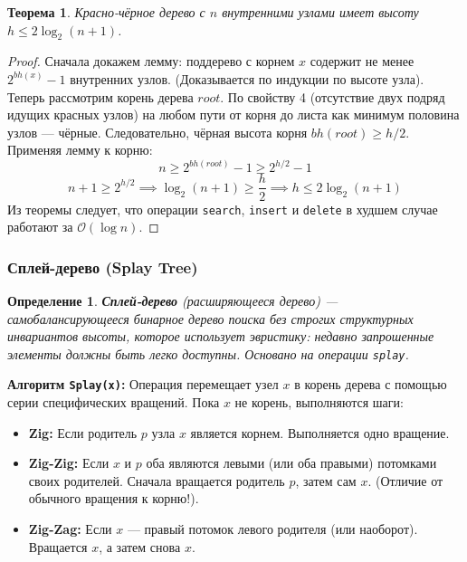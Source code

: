 \documentclass[12pt,a4paper]{article}
\newtheorem{definition}{Определение}
\newtheorem{theorem}{Теорема}
\begin{document}
\begin{theorem}
Красно-чёрное дерево с $n$ внутренними узлами имеет высоту $h \le 2 \log_2(n+1)$.
\end{theorem}
\begin{proof}
Сначала докажем лемму: поддерево с корнем $x$ содержит не менее $2^{bh(x)} - 1$ внутренних узлов. (Доказывается по индукции по высоте узла).
Теперь рассмотрим корень дерева $root$. По свойству 4 (отсутствие двух подряд идущих красных узлов) на любом пути от корня до листа как минимум половина узлов — чёрные. Следовательно, чёрная высота корня $bh(root) \ge h/2$.
Применяя лемму к корню:
$$ n \ge 2^{bh(root)} - 1 \ge 2^{h/2} - 1 $$
$$ n + 1 \ge 2^{h/2} \implies \log_2(n+1) \ge \frac{h}{2} \implies h \le 2 \log_2(n+1) $$
Из теоремы следует, что операции \texttt{search}, \texttt{insert} и \texttt{delete} в худшем случае работают за $\mathcal{O}(\log n)$.
\end{proof}

\subsubsection{Сплей-дерево (Splay Tree)}
\begin{definition}
\textbf{Сплей-дерево} (расширяющееся дерево) — самобалансирующееся бинарное дерево поиска без строгих структурных инвариантов высоты, которое использует эвристику: недавно запрошенные элементы должны быть легко доступны. Основано на операции \texttt{splay}.
\end{definition}

\textbf{Алгоритм \texttt{Splay(x)}:}
Операция перемещает узел $x$ в корень дерева с помощью серии специфических вращений. Пока $x$ не корень, выполняются шаги:
\begin{itemize}
    \item \textbf{Zig:} Если родитель $p$ узла $x$ является корнем. Выполняется одно вращение.
    \item \textbf{Zig-Zig:} Если $x$ и $p$ оба являются левыми (или оба правыми) потомками своих родителей. Сначала вращается родитель $p$, затем сам $x$. (Отличие от обычного вращения к корню!).
    \item \textbf{Zig-Zag:} Если $x$ — правый потомок левого родителя (или наоборот). Вращается $x$, а затем снова $x$.
\end{itemize}
\end{document}
